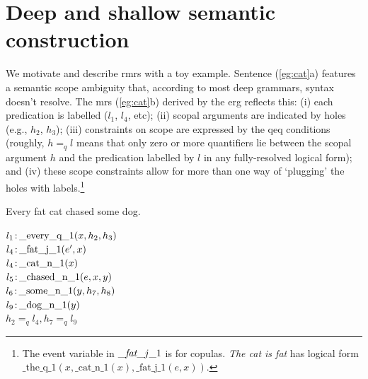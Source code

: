 \section{Deep and shallow semantic construction}
\label{sec:motivation}

%

We motivate and describe {\sc rmrs} with a toy
example.  Sentence 
(\ref{eg:cat}a) features a semantic scope ambiguity that, according to
most deep grammars, syntax
doesn't resolve.    The {\sc mrs} (\ref{eg:cat}b) derived by the
{\sc erg} \cite{copestake:flickinger:2000}
reflects this: (i) each predication is
labelled ($l_1$, $l_4$, etc); (ii) scopal arguments are indicated by
holes (e.g., $h_2$, $h_3$); (iii)
constraints on scope are expressed by the qeq conditions (roughly, $h
=_q l$ means that only zero or more quantifiers lie between the scopal
argument $h$ and the predication labelled by $l$ in any fully-resolved
logical form); and (iv) these scope
constraints allow for more than one way of `plugging' the holes with
labels.\footnote{The event variable in $\_\mbox{{\em fat}}\_j\_1$ is 
  for copulas. {\em The
    cat is fat} has logical form 
  $\mbox{\_the\_q\_1}(x,\mbox{\_cat\_n\_1}(x),\mbox{\_fat\_j\_1}(e,x))$.}
\begin{examples}
\item   \label{eg:cat}
\begin{subexamples}
\item
Every fat cat chased some dog.
\item   $l_1\colon\!\mbox{\_every\_q\_1}(x,h_2,h_3)$\\
$l_4\colon\!\mbox{\_fat\_j\_1}(e',x)$\\
$l_4\colon\!\mbox{\_cat\_n\_1}(x)$\\
$l_5\colon\!\mbox{\_chased\_n\_1}(e,x,y)$\\
$l_6\colon\!\mbox{\_some\_n\_1}(y,h_7,h_8)$\\
$l_9\colon\!\mbox{\_dog\_n\_1}(y)$\\
$h_2 =_q l_4, h_7 =_q l_9$
\end{subexamples}
\end{examples}
